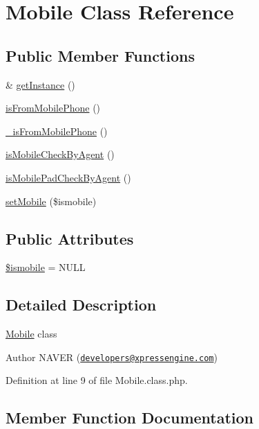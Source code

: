 \hypertarget{classMobile}{}\section{Mobile Class Reference}
\label{classMobile}
\subsection*{Public Member Functions}
\begin{DoxyCompactItemize}
\item 
\& \hyperlink{classMobile_a303f0bf07eb32a56769009c12c70d954}{get\+Instance} ()
\item 
\hyperlink{classMobile_a9978671e8463a94130a6733f2d0fa0a4}{is\+From\+Mobile\+Phone} ()
\item 
\hyperlink{classMobile_a5f539dee62a4a3e83db1df0f2d9573e4}{\+\_\+is\+From\+Mobile\+Phone} ()
\item 
\hyperlink{classMobile_a58dde3c19008fb6fff64140c0b34a5ee}{is\+Mobile\+Check\+By\+Agent} ()
\item 
\hyperlink{classMobile_a137e8bae3e1f34b018864d2df624113f}{is\+Mobile\+Pad\+Check\+By\+Agent} ()
\item 
\hyperlink{classMobile_a82db2bb3415147c24d429bb065542053}{set\+Mobile} (\$ismobile)
\end{DoxyCompactItemize}
\subsection*{Public Attributes}
\begin{DoxyCompactItemize}
\item 
\hyperlink{classMobile_a321b198b13267ac948fb78b6dc09de4e}{\$ismobile} = N\+U\+L\+L
\end{DoxyCompactItemize}


\subsection{Detailed Description}
\hyperlink{classMobile}{Mobile} class

\begin{DoxyAuthor}{Author}
N\+A\+V\+E\+R (\href{mailto:developers@xpressengine.com}{\tt developers@xpressengine.\+com}) 
\end{DoxyAuthor}


Definition at line 9 of file Mobile.\+class.\+php.



\subsection{Member Function Documentation}
\hypertarget{classMobile_a5f539dee62a4a3e83db1df0f2d9573e4}{}
